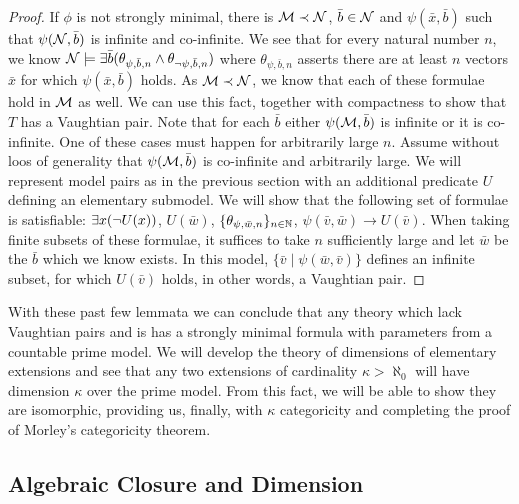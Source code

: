 \begin{proof}
If \(\phi\) is not strongly minimal, there is \(\mathcal{M} \prec \mathcal{N}\), \(\bar{b} \in \mathcal{N}\) and \(\psi(\bar{x}, \bar{b})\) such that \(\psi(\mathcal{N}, \bar{b})\) is infinite and co-infinite. 
We see that for every natural number \(n\), we know \(\mathcal{N} \models \exists \bar{b} (\theta_{\psi, \bar{b}, n} \land \theta_{\neg \psi, \bar{b}, n})\) where \(\theta_{\psi, \bar{b},n}\) asserts there are at least \(n\) vectors \(\bar{x}\) for which \(\psi(\bar{x}, \bar{b})\) holds. 
As \(\mathcal{M} \prec \mathcal{N}\), we know that each of these formulae hold in \(\mathcal{M}\) as well. 
We can use this fact, together with compactness to show that \(T\) has a Vaughtian pair.
Note that for each \(\bar{b}\) either \(\psi(\mathcal{M}, \bar{b})\) is infinite or it is co-infinite. 
One of these cases must happen for arbitrarily large \(n\).  %
Assume without loos of generality that \(\psi(\mathcal{M}, \bar{b})\) is co-infinite and arbitrarily large. 
We will represent model pairs as in the previous section with an additional predicate \(U\) defining an elementary submodel. 
We will show that the following set of formulae is satisfiable: 
\(\exists x (\neg U(x))\), \(U(\bar{w})\), \(\{\theta_{\psi, \bar{w}, n}\}_{n\in \mathbb{N}}\), \(\psi(\bar{v}, \bar{w}) \to U(\bar{v})\). 
When taking finite subsets of these formulae, it suffices to take \(n\) sufficiently large and let \(\bar{w}\) be the \(\bar{b}\) which we know exists.
In this model, \(\{\bar{v}\mid\psi(\bar{w}, \bar{v})\}\) defines an infinite subset, for which \(U(\bar{v})\) holds, in other words, a Vaughtian pair. %
\end{proof}

With these past few lemmata we can conclude that any theory which lack Vaughtian pairs and is \omst has a strongly minimal formula with parameters from a countable prime model. 
We will develop the theory of dimensions of elementary extensions and see that any two extensions of cardinality \(\kappa > \aleph_0\) will have dimension \(\kappa\) over the prime model.
From this fact, we will be able to show they are isomorphic, providing us, finally, with \(\kappa\) categoricity and completing the proof of Morley's categoricity theorem. 

\subsection{Algebraic Closure and Dimension}

